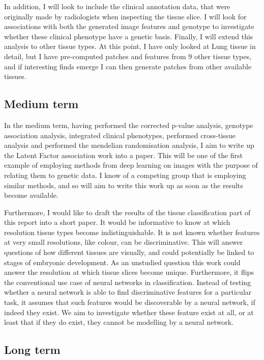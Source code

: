 \documentclass[graybox]{svmult}
\begin{document}
In addition, I will look to include the clinical annotation data, that were originally made by radiologists when inspecting the tissue slice. I will look for associations with both the generated image features and genotype to investigate whether these clinical phenotype have a genetic basis.
Finally, I will extend this analysis to other tissue types. At this point, I have only looked at Lung tissue in detail, but I have pre-computed patches and features from 9 other tissue types, and if interesting finds emerge I can then generate patches from other available tissues.

\subsection{Medium term}


In the medium term, having performed the corrected p-value analysis, genotype association analysis, integrated clinical phenotypes, performed cross-tissue analysis and performed the mendelian randomisation analysis, I aim to write up the Latent Factor association work into a paper. This will be one of the first example of employing methods from deep learning on images with the purpose of relating them to genetic data. I know of a competing group that is employing similar methods, and so will aim to write this work up as soon as the results become available.

Furthermore, I would like to draft the results of the tissue classification part of this report into a short paper. It would be informative to know at which resolution tissue types become indistinguishable. It is not known whether features at very small resolutions, like colour, can be discriminative. This will answer questions of how different tissues are visually, and could potentially be linked to stages of embryonic development. As an unstudied question this work could answer the resolution at which tissue slices become unique. Furthermore, it flips the conventional use case of neural networks in classification. Instead of testing whether a neural network is able to find discriminative features for a particular task, it assumes that such features would be discoverable by a neural network, if indeed they exist. We aim to investigate whether these feature exist at all, or at least that if they do exist, they cannot be modelling by a neural network.


\subsection{Long term}
\end{document}
